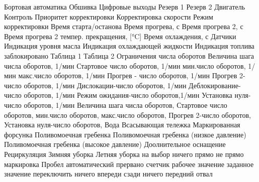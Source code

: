  {Бортовая автоматика}
 {Обшивка}
 {Цифровые выходы}
 {Резерв 1}
 {Резерв 2}
 {Двигатель}
 {Контроль}
 {Приоритет корректировки}
 {Корректировка скорости}
 {Режим корректировки}
 {Время старта/останова}
 {Время прогрева, с}
 {Время прогрева 2, с}
 {Время прогрева 2 темпер. прекращения, [°C]}
 {Время охлаждения, с}
 {Датчики}
 {Индикация уровня масла}
 {Индикация охлаждающей жидкости}
 {Индикация топлива}
 {заблокировано}
 {Таблица 1}
 {Таблица 2}
 {Ограничения числа оборотов}
 {Величина шага числа оборотов, 1/мин}
 {Стартовое число оборотов, 1/мин}
 {мин.число оборотов, 1/мин}
 {макс.число оборотов, 1/мин}
 {Прогрев - число оборотов, 1/мин}
 {Прогрев 2-число оборотов, 1/мин}
 {Дислокации-число оборотов, 1/мин}
 {Деблокирование-число оборотов, 1/мин}
 {Режим ожидания-число оборотов,1/мин}
 {Установка нуля-число оборотов, 1/мин}
 {Величина шага числа оборотов, \percent }
 {Стартовое число оборотов, \percent }
 {мин.число оборотов, \percent }
 {макс.число оборотов, \percent }
 {Прогрев 2-число оборотов, \percent }
 {Установка нуля-число оборотов,\percent }
 {Вода}
 {Всасывающая тележка}
 {Маркированная форсунка}
 {Поливомоечная гребенка}
 {Поливомоечная гребенка (низкое давление)}
 {Поливомоечная гребенка (высокое давление)}
 {Доолнительное оснащение}
 {Рециркуляция}
 {Зимняя уборка}
 {Летняя уборка}
 {на выбор}
 {ничего}
 {прямо}
 {не прямо}
 {маркировка}
 {Пробел}
 {автоматический}
 {прервано}
 {счетчик}
 {рабочее значение}
 {заданное значение}
 {переключить}
 {ничего}
 {впереди}
 {сзади}
 {ничего}
 {передний отвал}
